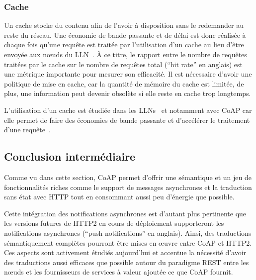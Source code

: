 \subsubsection{Cache}
\label{gw:cache}

Un cache stocke du contenu afin de l'avoir à disposition sans le redemander au reste du réseau.
Une économie de bande passante et de délai est donc réalisée à chaque fois qu'une requête est traitée par l'utilisation d'un cache au lieu d'être envoyée aux nœuds du \ac{LLN}~\cite{wessels2001web}.
À ce titre, le rapport entre le nombre de requêtes traitées par le cache sur le nombre de requêtes total (``hit rate'' en anglais)  est une métrique importante pour mesurer son efficacité.
Il est nécessaire d'avoir une politique de mise en cache, car la quantité de mémoire du cache est limitée, de plus, une information peut devenir obsolète si elle reste en cache trop longtemps.

L'utilisation d'un cache est étudiée dans les \ac{LLN}s~\cite{colitti2011rest} et notamment avec \ac{CoAP} car elle permet de faire des économies de bande passante et d'accélérer le traitement d'une requête~\cite{rfc7641}.

\subsection*{Conclusion intermédiaire}

Comme vu dans cette section, \ac{CoAP} permet d'offrir une sémantique et un jeu de fonctionnalités riches comme le support de messages asynchrones et la traduction sans état avec \ac{HTTP} tout en consommant aussi peu d'énergie que possible.

Cette intégration des notifications asynchrones est d'autant plus pertinente que les versions futures de \ac{HTTP}2 en cours de déploiement supporteront les notifications asynchrones (``push notifications'' en anglais).
Ainsi, des traductions sémantiquement complètes pourront être mises en œuvre entre \ac{CoAP} et \ac{HTTP}2.
Ces aspects sont activement étudiés aujourd'hui et accentue la nécessité d'avoir des traductions aussi efficaces que possible autour du paradigme \ac{REST} entre les nœuds et les fournisseurs de services à valeur ajoutée ce que \ac{CoAP} fournit.

